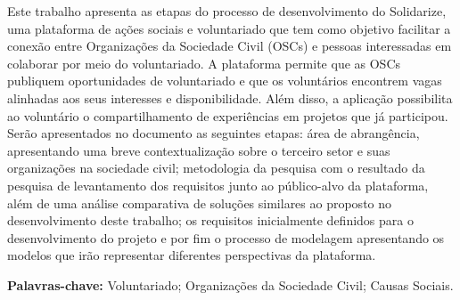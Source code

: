 \begin{resumo}
    Este trabalho apresenta as etapas do processo de desenvolvimento do
    Solidarize, uma plataforma de ações sociais e voluntariado que tem como objetivo
    facilitar a conexão entre Organizações da Sociedade Civil (OSCs) e pessoas
    interessadas em colaborar por meio do voluntariado. A plataforma permite que as
    OSCs publiquem oportunidades de voluntariado e que os voluntários encontrem
    vagas alinhadas aos seus interesses e disponibilidade. Além disso, a aplicação
    possibilita ao voluntário o compartilhamento de experiências em projetos que já
    participou. Serão apresentados no documento as seguintes etapas: área de
    abrangência, apresentando uma breve contextualização sobre o terceiro setor e
    suas organizações na sociedade civil; metodologia da pesquisa com o resultado da
    pesquisa de levantamento dos requisitos junto ao público-alvo da plataforma, além
    de uma análise comparativa de soluções similares ao proposto no desenvolvimento
    deste trabalho; os requisitos inicialmente definidos para o desenvolvimento do
    projeto e por fim o processo de modelagem apresentando os modelos que irão
    representar diferentes perspectivas da plataforma.
    \vspace{0.5cm}

    \textbf{Palavras-chave:} Voluntariado; Organizações da Sociedade Civil; Causas
    Sociais.
\end{resumo}